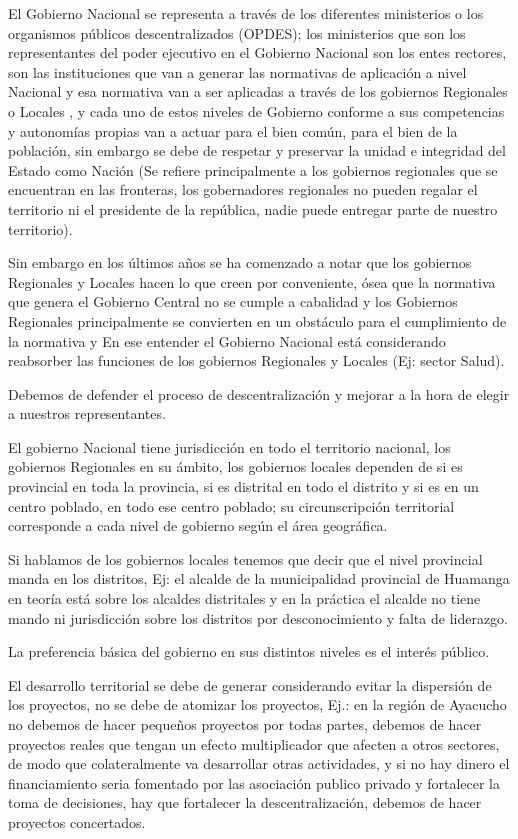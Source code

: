 \documentclass[
  letterpaper,
  DIV=11,
  numbers=noendperiod]{scrartcl}
\begin{document}
El Gobierno Nacional se representa a través de los diferentes
ministerios o los organismos públicos descentralizados (OPDES); los
ministerios que son los representantes del poder ejecutivo en el
Gobierno Nacional son los entes rectores, son las instituciones que van
a generar las normativas de aplicación a nivel Nacional y esa normativa
van a ser aplicadas a través de los gobiernos Regionales o Locales , y
cada uno de estos niveles de Gobierno conforme a sus competencias y
autonomías propias van a actuar para el bien común, para el bien de la
población, sin embargo se debe de respetar y preservar la unidad e
integridad del Estado como Nación (Se refiere principalmente a los
gobiernos regionales que se encuentran en las fronteras, los
gobernadores regionales no pueden regalar el territorio ni el presidente
de la república, nadie puede entregar parte de nuestro territorio).

Sin embargo en los últimos años se ha comenzado a notar que los
gobiernos Regionales y Locales hacen lo que creen por conveniente, ósea
que la normativa que genera el Gobierno Central no se cumple a cabalidad
y los Gobiernos Regionales principalmente se convierten en un obstáculo
para el cumplimiento de la normativa y En ese entender el Gobierno
Nacional está considerando reabsorber las funciones de los gobiernos
Regionales y Locales (Ej: sector Salud).

Debemos de defender el proceso de descentralización y mejorar a la hora
de elegir a nuestros representantes.

El gobierno Nacional tiene jurisdicción en todo el territorio nacional,
los gobiernos Regionales en su ámbito, los gobiernos locales dependen de
si es provincial en toda la provincia, si es distrital en todo el
distrito y si es en un centro poblado, en todo ese centro poblado; su
circunscripción territorial corresponde a cada nivel de gobierno según
el área geográfica.

Si hablamos de los gobiernos locales tenemos que decir que el nivel
provincial manda en los distritos, Ej: el alcalde de la municipalidad
provincial de Huamanga en teoría está sobre los alcaldes distritales y
en la práctica el alcalde no tiene mando ni jurisdicción sobre los
distritos por desconocimiento y falta de liderazgo.

La preferencia básica del gobierno en sus distintos niveles es el
interés público.

El desarrollo territorial se debe de generar considerando evitar la
dispersión de los proyectos, no se debe de atomizar los proyectos, Ej.:
en la región de Ayacucho no debemos de hacer pequeños proyectos por
todas partes, debemos de hacer proyectos reales que tengan un efecto
multiplicador que afecten a otros sectores, de modo que colateralmente
va desarrollar otras actividades, y si no hay dinero el financiamiento
seria fomentado por las asociación publico privado y fortalecer la toma
de decisiones, hay que fortalecer la descentralización, debemos de hacer
proyectos concertados.
\end{document}
